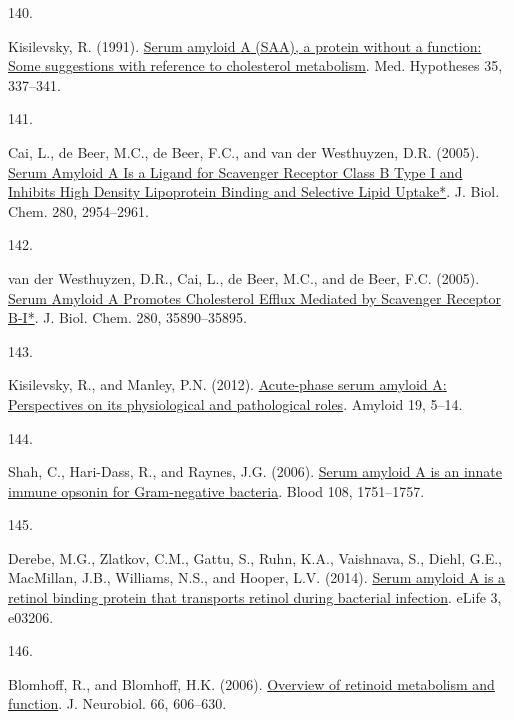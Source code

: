 \documentclass[
]{article}
\newlength{\cslhangindent}
\newlength{\csllabelwidth}
\newlength{\cslentryspacingunit} %
\newenvironment{CSLReferences}[2] %
 {%
  \setlength{\parindent}{0pt}
  \ifodd #1
  \let\oldpar\par
  \def\par{\hangindent=\cslhangindent\oldpar}
  \fi
  \setlength{\parskip}{#2\cslentryspacingunit}
 }%
 {}
\newcommand{\CSLLeftMargin}[1]{\parbox[t]{\csllabelwidth}{#1}}
\newcommand{\CSLRightInline}[1]{\parbox[t]{\linewidth - \csllabelwidth}{#1}\break}
\begin{document}
\begin{CSLReferences}{0}{0}
\leavevmode{}%
\CSLLeftMargin{140. }
\CSLRightInline{Kisilevsky, R. (1991). \href{https://doi.org/10.1016/0306-9877(91)90280-C}{Serum amyloid {A} ({SAA}), a protein without a function: {Some} suggestions with reference to cholesterol metabolism}. Med. Hypotheses 35, 337--341.}

\leavevmode{}%
\CSLLeftMargin{141. }
\CSLRightInline{Cai, L., de Beer, M.C., de Beer, F.C., and van der Westhuyzen, D.R. (2005). \href{https://doi.org/10.1074/jbc.M411555200}{Serum {Amyloid A Is} a {Ligand} for {Scavenger Receptor Class B Type I} and {Inhibits High Density Lipoprotein Binding} and {Selective Lipid Uptake}*}. J. Biol. Chem. 280, 2954--2961.}

\leavevmode{}%
\CSLLeftMargin{142. }
\CSLRightInline{van der Westhuyzen, D.R., Cai, L., de Beer, M.C., and de Beer, F.C. (2005). \href{https://doi.org/10.1074/jbc.M505685200}{Serum {Amyloid A Promotes Cholesterol Efflux Mediated} by {Scavenger Receptor B-I}*}. J. Biol. Chem. 280, 35890--35895.}

\leavevmode{}%
\CSLLeftMargin{143. }
\CSLRightInline{Kisilevsky, R., and Manley, P.N. (2012). \href{https://doi.org/10.3109/13506129.2011.654294}{Acute-phase serum amyloid {A}: {Perspectives} on its physiological and pathological roles}. Amyloid 19, 5--14.}

\leavevmode{}%
\CSLLeftMargin{144. }
\CSLRightInline{Shah, C., Hari-Dass, R., and Raynes, J.G. (2006). \href{https://doi.org/10.1182/blood-2005-11-011932}{Serum amyloid {A} is an innate immune opsonin for {Gram-negative} bacteria}. Blood 108, 1751--1757.}

\leavevmode{}%
\CSLLeftMargin{145. }
\CSLRightInline{Derebe, M.G., Zlatkov, C.M., Gattu, S., Ruhn, K.A., Vaishnava, S., Diehl, G.E., MacMillan, J.B., Williams, N.S., and Hooper, L.V. (2014). \href{https://doi.org/10.7554/elife.03206}{Serum amyloid {A} is a retinol binding protein that transports retinol during bacterial infection}. eLife 3, e03206.}

\leavevmode{}%
\CSLLeftMargin{146. }
\CSLRightInline{Blomhoff, R., and Blomhoff, H.K. (2006). \href{https://doi.org/10.1002/neu.20242}{Overview of retinoid metabolism and function}. J. Neurobiol. 66, 606--630.}


\end{CSLReferences}
\end{document}
